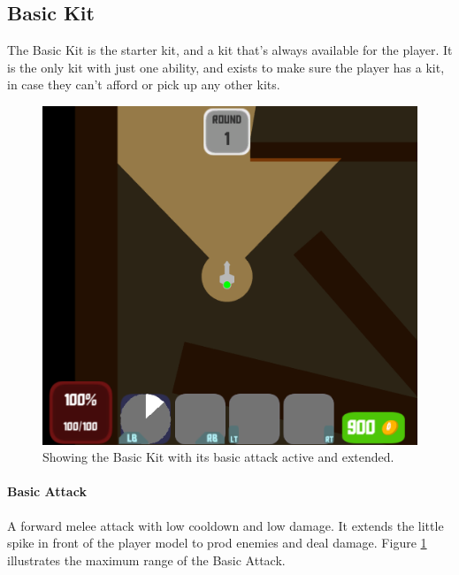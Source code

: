\subsection{Basic Kit}
The Basic Kit is the starter kit, and a kit that's always available for the player. It is the only kit with just one ability, and exists to make sure the player has a kit, in case they can't afford or pick up any other kits.

\begin{figure}[tbph]  %
  \centering
  \includegraphics[width=.75\textwidth]{images/BasicAttackActive}
  \caption[Screenshot of Basic Kit]{Showing the Basic Kit with its basic attack active and extended.}
  \label{fig:basicKit}
\end{figure}

\paragraph{Basic Attack}
A forward melee attack with low cooldown and low damage. It extends the little spike in front of the player model to prod enemies and deal damage. Figure \ref{fig:basicKit} illustrates the maximum range of the Basic Attack.

